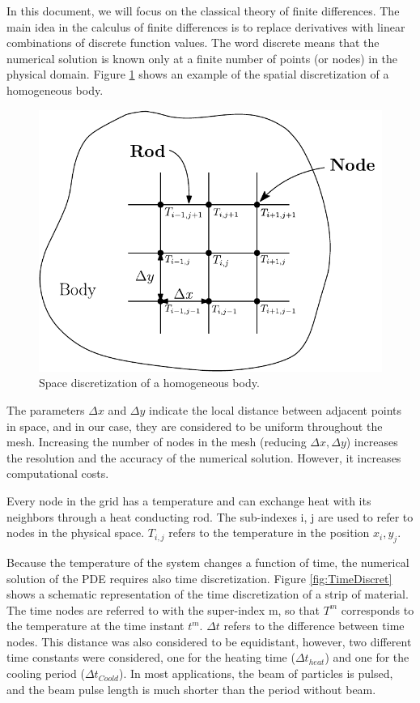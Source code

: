 In this document, we will focus on the classical theory of finite differences. The main idea in the calculus of finite differences is to replace derivatives with linear combinations of discrete function values. The word discrete means that the numerical solution is known only at a finite number of points (or nodes) in the physical domain. Figure \ref{fig:SpaceDiscret} shows an example of the spatial discretization of a homogeneous body. 

\begin{figure}[h]
    \centering
    \includegraphics[width=0.5\columnwidth]{SpaceDiscretization/SpaceDiscretization.pdf}
    \caption{Space discretization of a homogeneous body.}
    \label{fig:SpaceDiscret}
\end{figure}

The parameters $\Delta x$ and $\Delta y$ indicate the local distance between adjacent points in space, and in our case, they are considered to be uniform throughout the mesh. Increasing the number of nodes in the mesh (reducing $\Delta x , \Delta y$) increases the resolution and the accuracy of the numerical solution. However, it increases computational costs.

Every node in the grid has a temperature and can exchange heat with its neighbors through a heat conducting rod. The sub-indexes i, j are used to refer to nodes in the physical space.  $T_{i,j}$ refers to the temperature in the position $x_i , y_j$.

Because the temperature of the system changes a function of time, the numerical solution of the PDE requires also time discretization. Figure \ref{fig:TimeDiscret} shows a schematic representation of the time discretization of a strip of material. The time nodes are referred to with the super-index m, so that $T^{m}$ corresponds to the temperature at the time instant  $t^m$.  $\Delta t$ refers to the difference between time nodes. This distance was also considered to be equidistant, however, two different time constants were considered, one for the heating time ($\Delta {t}_{heat}$) and one for the cooling period ($\Delta t_{Coold}$). In most applications, the beam of particles is pulsed, and the beam pulse length is much shorter than the period without beam. 


